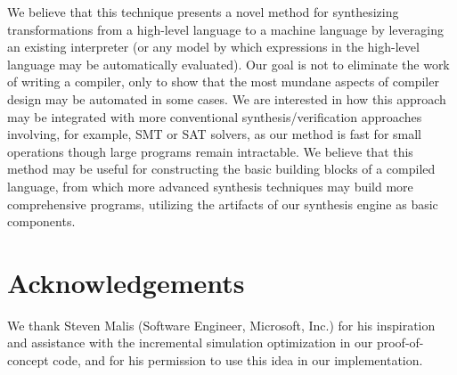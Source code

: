 \documentclass{article}
\begin{document}
We believe that this technique presents a novel method for synthesizing
transformations from a high-level language to a machine language by leveraging
an existing interpreter (or any model by which expressions in the high-level
language may be automatically evaluated).  Our goal is not to eliminate the
work of writing a compiler, only to show that the most mundane aspects of
compiler design may be automated in some cases.  We are interested in how this
approach may be integrated with more conventional synthesis/verification
approaches involving, for example, SMT or SAT solvers, as our method is fast
for small operations though large programs remain intractable.  We believe that
this method may be useful for constructing the basic building blocks of a
compiled language, from which more advanced synthesis techniques may build more
comprehensive programs, utilizing the artifacts of our synthesis engine as
basic components.

\section*{Acknowledgements}

We thank Steven Malis (Software Engineer, Microsoft, Inc.) for his inspiration
and assistance with the incremental simulation optimization in our
proof-of-concept code, and for his permission to use this idea in our
implementation.


	
\end{document}
